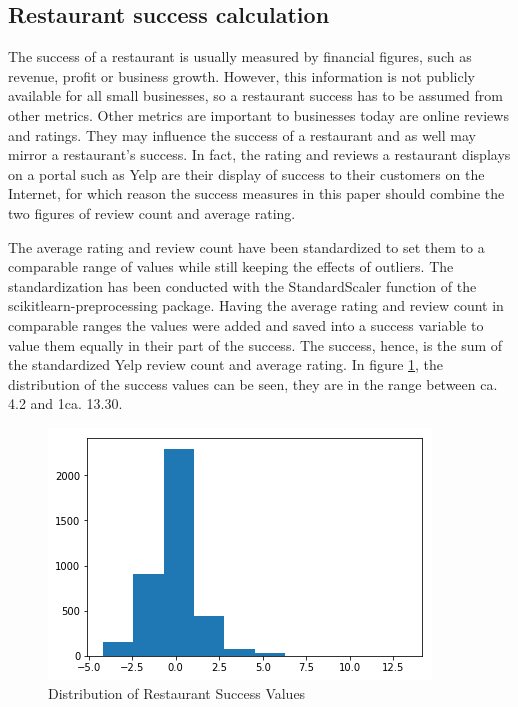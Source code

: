 \documentclass[a4paper, 11pt, oneside]{Thesis}  %
\begin{document}
\subsection{Restaurant success calculation}

The success of a restaurant is usually measured by financial figures, such as revenue, profit or business growth. However, this information is not publicly available for all small businesses, so a restaurant success has to be assumed from other metrics. Other metrics are important to businesses today are online reviews and ratings. They may influence the success of a restaurant and as well may mirror a restaurant's success. In fact, the rating and reviews a restaurant displays on a portal such as Yelp are their display of success to their customers on the Internet, for which reason the success measures in this paper should combine the two figures of review count and average rating.

The average rating and review count have been standardized to set them to a comparable range of values while still keeping the effects of outliers. The standardization has been conducted with the StandardScaler function of the scikitlearn-preprocessing package. Having the average rating and review count in comparable ranges the values were added and saved into a success variable to value them equally in their part of the success. The success, hence, is the sum of the standardized Yelp review count and average rating. In figure \ref{fig:restaurant_success_distribution}, the distribution of the success values can be seen, they are in the range between ca. 4.2 and 1ca. 13.30.

\begin{figure}[h]
\includegraphics[scale=0.5]{Figures/restaurant_success_distribution.png}
\centering
\caption{Distribution of Restaurant Success Values}
\label{fig:restaurant_success_distribution}
\end{figure}
\end{document}
